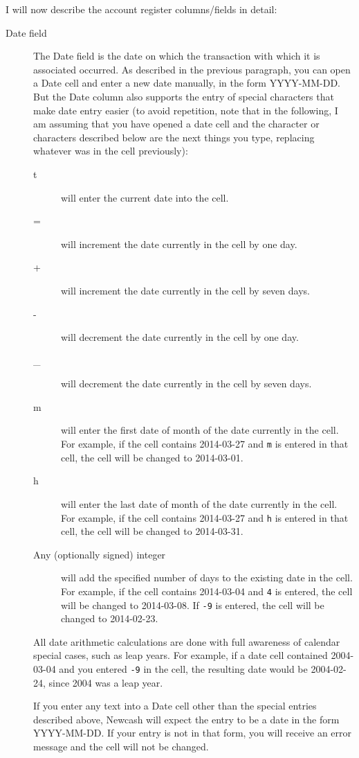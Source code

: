 \documentclass{report}
\begin{document}
I will now describe the account register columns/fields in detail:
\begin{description}
\item[Date field]
The Date field is the date on which the transaction with which it is associated occurred. As described in the previous paragraph, you can open a Date cell and enter a new date manually, in the form YYYY-MM-DD. But the Date column also supports the entry of special characters that make date entry easier (to avoid repetition, note that in the following, I am assuming that you have opened a date cell and the character or characters described below are the next things you type, replacing whatever was in the cell previously):
\begin{description}
\item [t] will enter the current date into the cell.
\item [=] will increment the date currently in the cell by one day.
\item [+] will increment the date currently in the cell by seven days.
\item [-] will decrement the date currently in the cell by one day.
\item [\_] will decrement the date currently in the cell by seven days.
\item [m] will enter the first date of month of the date currently in the cell. For example, if the cell contains 2014-03-27 and \verb|m| is entered in that cell, the cell will be changed to 2014-03-01.
\item [h] will enter the last date of month of the date currently in the cell. For example, if the cell contains 2014-03-27 and \verb|h| is entered in that cell, the cell will be changed to 2014-03-31.
\item [Any (optionally signed) integer] will add the specified number of days to the existing date in the cell. For example, if the cell contains 2014-03-04 and \verb|4| is entered, the cell will be changed to 2014-03-08. If \verb|-9| is entered, the cell will be changed to 2014-02-23. 
\end{description}

All date arithmetic calculations are done with full awareness of calendar special cases, such as leap years. For example, if a date cell contained 2004-03-04 and you entered \verb|-9| in the cell, the resulting date would be 2004-02-24, since 2004 was a leap year.

If you enter any text into a Date cell other than the special entries described above, Newcash will expect the entry to be a date in the form YYYY-MM-DD. If your entry is not in that form, you will receive an error message and the cell will not be changed.


\end{description}
\end{document}
